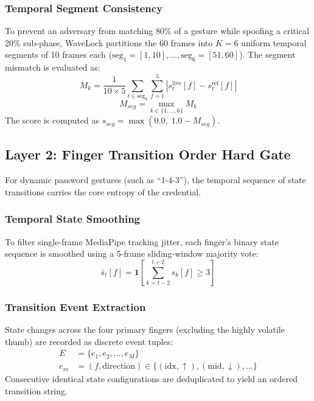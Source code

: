 \documentclass[conference]{IEEEtran}
\begin{document}
\subsubsection{Temporal Segment Consistency}
To prevent an adversary from matching 80\% of a gesture while spoofing a critical 20\% sub-phase, WaveLock partitions the 60 frames into $K = 6$ uniform temporal segments of 10 frames each ($\text{seg}_1 = [1, 10], \ldots, \text{seg}_6 = [51, 60]$). The segment mismatch is evaluated as:
\begin{equation}
M_k = \frac{1}{10 \times 5} \sum_{t \in \text{seg}_k} \sum_{f=1}^{5} |s_t^{\text{live}}[f] - s_t^{\text{ref}}[f]|
\end{equation}
\begin{equation}
M_{seg} = \max_{k \in \{1, \ldots, 6\}} M_k
\label{eq:segment_max}
\end{equation}
The score is computed as $s_{seg} = \max(0.0,\; 1.0 - M_{seg})$.

\subsection{Layer 2: Finger Transition Order Hard Gate}

For dynamic password gestures (such as ``1-4-3''), the temporal sequence of state transitions carries the core entropy of the credential.

\subsubsection{Temporal State Smoothing}
To filter single-frame MediaPipe tracking jitter, each finger's binary state sequence is smoothed using a 5-frame sliding-window majority vote:
\begin{equation}
\bar{s}_t[f] = \mathbf{1}\left[ \sum_{k=t-2}^{t+2} s_k[f] \ge 3 \right]
\end{equation}

\subsubsection{Transition Event Extraction}
State changes across the four primary fingers (excluding the highly volatile thumb) are recorded as discrete event tuples:
\begin{equation}
\begin{split}
E &= \{e_1, e_2, \ldots, e_M\} \\
e_m &= (f, \text{direction}) \in \{(\text{idx}, \uparrow), (\text{mid}, \downarrow), \ldots\}
\end{split}
\end{equation}
Consecutive identical state configurations are deduplicated to yield an ordered transition string.
\end{document}
